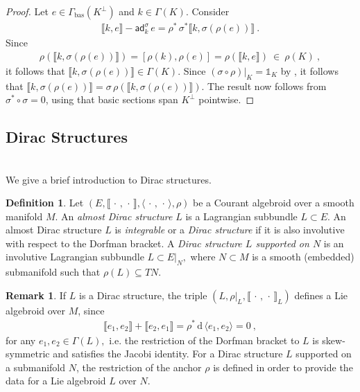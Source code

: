 \documentclass[a4paper, reqno, 11pt]{amsart}
\numberwithin{equation}{section}
\theoremstyle{definition}
\newtheorem{definition}[equation]{Definition}
\newtheorem{remark}[equation]{Remark}
\newcommand{\sfgamma}{\mathsf{\Gamma}}
\newcommand{\cbrak}[1]{\llbracket #1 \rrbracket}
\newcommand{\ip}[1]{\langle #1 \rangle}
\newcommand{\de}{\mathrm{d}}
\newcommand{\unit}{\mathds{1}}   			%
\newcommand{\sfgammabas}{\sfgamma_{\text{bas}}}
\newcommand{\ad}{\mathsf{ad}}
\theoremstyle{remark}
\begin{document}
\begin{proof}
    Let $e \in \sfgammabas(K^\perp)$ and $k\in \sfgamma(K)$. Consider 
    \begin{align}
        \cbrak{k,e} - \ad^\sigma_k\, e = \rho^*\, \sigma^* \cbrak{k, \sigma(\rho( e))} \ .
    \end{align}
    Since
    \begin{align}
        \rho(\cbrak{k, \sigma (\rho (e))}) = [\rho(k), \rho(e)] = \rho(\cbrak{k,e}) \ \in \  \rho(K) \ ,
    \end{align}
    it follows that $\cbrak{k, \sigma( \rho( e))} \in \sfgamma(K)$. Since $(\sigma \circ \rho)|_K = \unit_K$ by \cite[Lemma 2.34]{DeFraja:2023fhe}, it follows that $\cbrak{k, \sigma (\rho( e))} = \sigma \, \rho(\cbrak{k, \sigma (\rho (e))})$. The result now follows from $\sigma^* \circ \sigma = 0$, using that basic sections span $K^\perp$ pointwise.
\end{proof}

\medskip

\subsection{Dirac Structures}~\\[5pt]
We give a brief introduction to Dirac structures.

\begin{definition}
 Let $(E,\llbracket\,\cdot\,,\,\cdot\,\rrbracket,\langle\,\cdot\,,\,\cdot\,\rangle,\rho)$   be a Courant algebroid over a smooth manifold $M$. An \emph{almost Dirac structure} $L$ is a Lagrangian subbundle $L \subset E.$ An almost Dirac structure $L$ is \emph{integrable} or a \emph{Dirac structure} if it is also involutive with respect to the Dorfman bracket. A \emph{Dirac structure $L$ supported on $N$} is an involutive Lagrangian subbundle $L \subset E \rvert_N,$ where $N \subset M$ is a smooth (embedded) submanifold such that $\rho(L) \subseteq TN.$ 
\end{definition}

\begin{remark}
If $L$ is a Dirac structure, the triple $(L, \rho \rvert_L , \llbracket\,\cdot\,,\,\cdot\,\rrbracket_L)$ defines a Lie algebroid over $M$, since
\begin{align}
    \llbracket e_1, e_2\rrbracket + \llbracket e_2, e_1\rrbracket = \rho^*\,\de \, \ip{e_1 , e_2} = 0 \ ,
\end{align}
for any $e_1, e_2 \in \mathsf{\Gamma}(L),$ i.e. the restriction of the Dorfman bracket to $L$ is skew-symmetric and satisfies the Jacobi identity. For a Dirac structure $L$ supported on a submanifold $N$, the restriction of the anchor $\rho$ is defined in order to provide the data for a Lie algebroid $L$ over $N.$
\end{remark}
\end{document}
